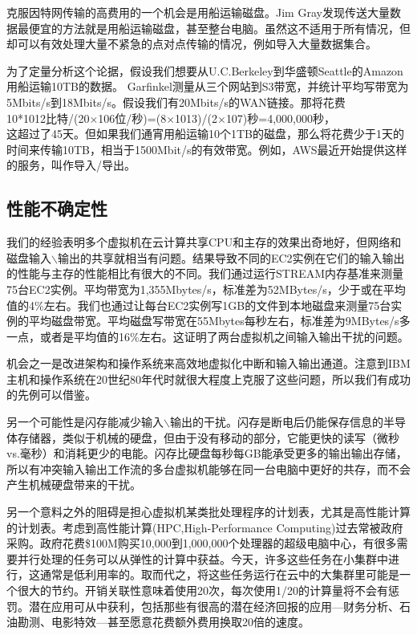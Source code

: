 克服因特网传输的高费用的一个机会是用船运输磁盘。Jim Gray发现传送大量数据最便宜的方法就是用船运输磁盘，甚至整台电脑。虽然这不适用于所有情况，但却可以有效处理大量不紧急的点对点传输的情况，例如导入大量数据集合。

为了定量分析这个论据，假设我们想要从U.C.Berkeley到华盛顿Seattle的Amazon用船运输10TB的数据。 Garfinkel测量从三个网站到S3带宽，并统计平均写带宽为5Mbits/s到18Mbits/s。假设我们有20Mbits/s的WAN链接。那将花费\\
10*1012比特/(20$\times$106位/秒)=(8$\times$1013)/(2$\times$107)秒=4,000,000秒，\\
这超过了45天。但如果我们通宵用船运输10个1TB的磁盘，那么将花费少于1天的时间来传输10TB，相当于1500Mbit/s的有效带宽。例如，AWS最近开始提供这样的服务，叫作导入/导出。

\subsection{性能不确定性}

我们的经验表明多个虚拟机在云计算共享CPU和主存的效果出奇地好，但网络和磁盘输入$\backslash$输出的共享就相当有问题。结果导致不同的EC2实例在它们的输入输出的性能与主存的性能相比有很大的不同。我们通过运行STREAM内存基准来测量75台EC2实例。平均带宽为1,355Mbytes/s，标准差为52MBytes/s，少于或在平均值的4\%左右。我们也通过让每台EC2实例写1GB的文件到本地磁盘来测量75台实例的平均磁盘带宽。平均磁盘写带宽在55Mbytes每秒左右，标准差为9MBytes/s多一点，或者是平均值的16\%左右。这证明了两台虚拟机之间输入输出干扰的问题。

机会之一是改进架构和操作系统来高效地虚拟化中断和输入输出通道。注意到IBM主机和操作系统在20世纪80年代时就很大程度上克服了这些问题，所以我们有成功的先例可以借鉴。

另一个可能性是闪存能减少输入$\backslash$输出的干扰。闪存是断电后仍能保存信息的半导体存储器，类似于机械的硬盘，但由于没有移动的部分，它能更快的读写（微秒vs.毫秒）和消耗更少的电能。闪存比硬盘每秒每GB能承受更多的输出输出存储，所以有冲突输入输出工作流的多台虚拟机能够在同一台电脑中更好的共存，而不会产生机械硬盘带来的干扰。

另一个意料之外的阻碍是担心虚拟机某类批处理程序的计划表，尤其是高性能计算的计划表。考虑到高性能计算(HPC,High-Performance Computing)过去常被政府采购。政府花费\$100M购买10,000到1,000,000个处理器的超级电脑中心，有很多需要并行处理的任务可以从弹性的计算中获益。今天，许多这些任务在小集群中进行，这通常是低利用率的。取而代之，将这些任务运行在云中的大集群里可能是一个很大的节约。开销关联性意味着使用20次，每次使用1/20的计算量将不会有惩罚。潜在应用可从中获利，包括那些有很高的潜在经济回报的应用—财务分析、石油勘测、电影特效—甚至愿意花费额外费用换取20倍的速度。

